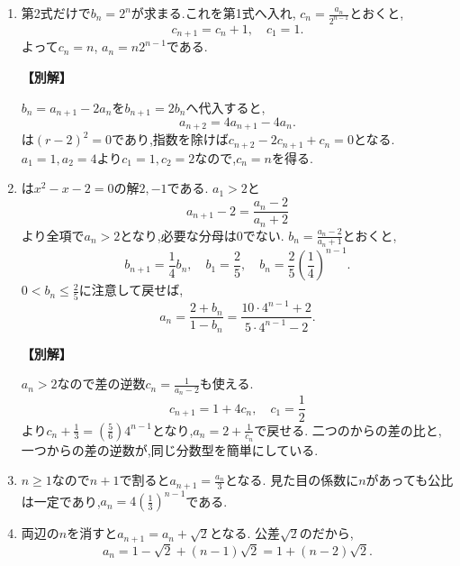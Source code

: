 \begin{enumerate}[label=\textbf{問\arabic*.},leftmargin=3.8em,format=\bookitemlink{practice-basic}{solution}{problem}]
  \item {}\BookMathLayout{}{\\}
    第2式だけで$b_n=2^n$が求まる.これを第1式へ入れ,
    $c_n=\frac{a_n}{2^{n-1}}$とおくと,
    \[
      c_{n+1}=c_n+1,\quad c_1=1.
    \]
    よって$c_n=n$, $a_n=n2^{n-1}$である.
    \par\smallskip\noindent\textbf{【別解】}\par
    $b_n=a_{n+1}-2a_n$を$b_{n+1}=2b_n$へ代入すると,
    \[
      a_{n+2}=4a_{n+1}-4a_n.
    \]
    は$(r-2)^2=0$であり,指数を除けば$c_{n+2}-2c_{n+1}+c_n=0$となる.
    $a_1=1,a_2=4$より$c_1=1,c_2=2$なので,$c_n=n$を得る.

  \item {}\BookMathLayout{}{\\}
    は$x^2-x-2=0$の解$2,-1$である.
    $a_1>2$と
    \[
      a_{n+1}-2=\frac{a_n-2}{a_n+2}
    \]
    より全項で$a_n>2$となり,必要な分母は0でない.
    $b_n=\frac{a_n-2}{a_n+1}$とおくと,
    \[
      b_{n+1}=\frac14b_n,\quad b_1=\frac25,
      \quad b_n=\frac25\left(\frac14\right)^{n-1}.
    \]
    $0<b_n\le\frac{2}{5}$に注意して戻せば,
    \[
      a_n=\frac{2+b_n}{1-b_n}
      =\frac{10\cdot4^{n-1}+2}{5\cdot4^{n-1}-2}.
    \]
    \par\smallskip\noindent\textbf{【別解】}\par
    $a_n>2$なので差の逆数$c_n=\frac{1}{a_n-2}$も使える.
    \[
      c_{n+1}=1+4c_n,\quad c_1=\frac12
    \]
    より$c_n+\frac{1}{3}=\left(\frac{5}{6}\right)4^{n-1}$となり,$a_n=2+\frac{1}{c_n}$で戻せる.
    二つのからの差の比と,一つからの差の逆数が,同じ分数型を簡単にしている.

  \item {}\BookMathLayout{}{\\}
    $n\ge1$なので$n+1$で割ると$a_{n+1}=\frac{a_n}{3}$となる.
    見た目の係数に$n$があっても公比は一定であり,$a_n=4\left(\frac{1}{3}\right)^{n-1}$である.

  \item {}\BookMathLayout{}{\\}
    両辺の$n$を消すと$a_{n+1}=a_n+\sqrt2$となる.
    公差$\sqrt2$のだから,
    \[
      a_n=1-\sqrt2+(n-1)\sqrt2=1+(n-2)\sqrt2.
    \]


\end{enumerate}
